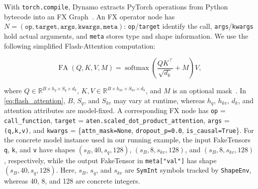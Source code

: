 \begin{center}
\end{center}
{\color{red}%
\par}
{\color{blue}%
With \texttt{torch.compile}, Dynamo extracts PyTorch operations from Python bytecode into an FX Graph~\cite{paszke2019pytorch,ansel2024dynamo}. An FX operator node has $N=(\texttt{op},\texttt{target},\texttt{args},\texttt{kwargs},\texttt{meta})$: \texttt{op}/\texttt{target} identify the call, \texttt{args}/\texttt{kwargs} hold actual arguments, and \texttt{meta} stores type and shape information. We use the following simplified Flash-Attention computation:
\par}
{\color{blue}
\begin{equation}
	\operatorname{FA}(Q,K,V,M)
	=
	\operatorname{softmax}\left(\frac{QK^\top}{\sqrt{d_k}}+M\right)V,
	\label{eq:flash_attention}
\end{equation}
}
{\color{blue}%
where $Q\in\mathbb{R}^{B\times h_q\times S_q\times d_k}$, $K,V\in\mathbb{R}^{B\times h_{kv}\times S_{kv}\times d_k}$, and $M$ is an optional mask~\cite{dao2024flashattention2}. In \autoref{eq:flash_attention}, $B$, $S_q$, and $S_{kv}$ may vary at runtime, whereas $h_q$, $h_{kv}$, $d_k$, and attention attributes are model-fixed. A corresponding FX node has \texttt{op} = \texttt{call\_function}, \texttt{target} = \texttt{aten.scaled\_dot\_product\_attention}, \texttt{args} = \texttt{(q,k,v)}, and \texttt{kwargs} = \{\texttt{attn\_mask=None}, \texttt{dropout\_p=0.0}, \texttt{is\_causal=True}\}. For the concrete model instance used in our running example, the input FakeTensors \texttt{q}, \texttt{k}, and \texttt{v} have shapes $(s_B,40,s_q,128)$, $(s_B,8,s_{kv},128)$, and $(s_B,8,s_{kv},128)$, respectively, while the output FakeTensor in \texttt{meta["val"]} has shape $(s_B,40,s_q,128)$. Here, $s_B$, $s_q$, and $s_{kv}$ are \texttt{SymInt} symbols tracked by \texttt{ShapeEnv}, whereas 40, 8, and 128 are concrete integers.
\par}

